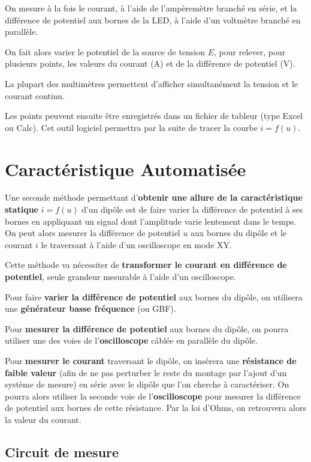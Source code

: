 On mesure à la fois le courant, à l'aide de l'ampèremètre branché en série, et la différence de potentiel aux bornes de la LED, à l'aide d'un voltmètre branché en parallèle.

On fait alors varier le potentiel de la source de tension $E$, pour relever, pour plusieurs points, les valeurs du courant (A) et de la différence de potentiel (V).

La plupart des multimètres permettent d'afficher simultanément la tension et le courant continu.

Les points peuvent ensuite être enregistrés dans un fichier de tableur (type Excel ou Calc). Cet outil logiciel permettra par la suite de tracer la courbe $i=f(u)$.



\newpage
\section{Caractéristique Automatisée}

Une seconde méthode permettant d'\textbf{obtenir une allure de la caractéristique statique }$i=f(u)$ d'un dipôle est de faire varier la différence de potentiel à ses bornes en appliquant un signal dont l'amplitude varie lentement dans le temps. On peut alors mesurer la différence de potentiel $u$ aux bornes du dipôle et le courant $i$ le traversant à l'aide d'un oscilloscope en mode XY.

Cette méthode va nécessiter de \textbf{transformer le courant en différence de potentiel}, seule grandeur mesurable à l'aide d'un oscilloscope.

Pour faire \textbf{varier la différence de potentiel} aux bornes du dipôle, on utilisera une \textbf{générateur basse fréquence} (ou GBF).

Pour \textbf{mesurer la différence de potentiel} aux bornes du dipôle, on pourra utiliser une des voies de l'\textbf{oscilloscope} câblée en parallèle du dipôle.

Pour \textbf{mesurer le courant} traversant le dipôle, on insérera une \textbf{résistance de faible valeur} (afin de ne pas perturber le reste du montage par l'ajout d'un système de mesure) en série avec le dipôle que l'on cherche à caractériser. On pourra alors utiliser la seconde voie de l'\textbf{oscilloscope} pour mesurer la différence de potentiel aux bornes de cette résistance. Par la loi d'Ohms, on retrouvera alors la valeur du courant.

\subsection{Circuit de mesure}

